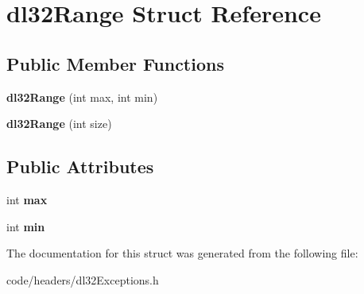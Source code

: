 \hypertarget{structdl32_range}{\section{dl32\-Range Struct Reference}
\label{structdl32_range}
}
\subsection*{Public Member Functions}
\begin{DoxyCompactItemize}
\item 
\hypertarget{structdl32_range_ad9b6e0ba2207b91fbe239a1bfff311bf}{{\bfseries dl32\-Range} (int max, int min)}\label{structdl32_range_ad9b6e0ba2207b91fbe239a1bfff311bf}

\item 
\hypertarget{structdl32_range_a0f5e72d16174631ff96bcb7cc60f98ef}{{\bfseries dl32\-Range} (int size)}\label{structdl32_range_a0f5e72d16174631ff96bcb7cc60f98ef}

\end{DoxyCompactItemize}
\subsection*{Public Attributes}
\begin{DoxyCompactItemize}
\item 
\hypertarget{structdl32_range_a43274897d348cdb731af1f3eecdc15d9}{int {\bfseries max}}\label{structdl32_range_a43274897d348cdb731af1f3eecdc15d9}

\item 
\hypertarget{structdl32_range_a5106a815125626863888410d24e39e9a}{int {\bfseries min}}\label{structdl32_range_a5106a815125626863888410d24e39e9a}

\end{DoxyCompactItemize}


The documentation for this struct was generated from the following file\-:\begin{DoxyCompactItemize}
\item 
code/headers/dl32\-Exceptions.\-h\end{DoxyCompactItemize}
